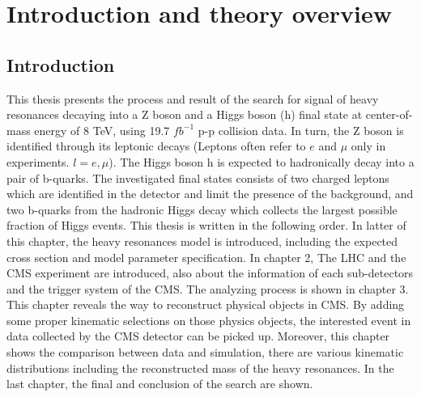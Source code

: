 \chapter{Introduction and theory overview}

\section{Introduction}
This thesis presents the process and result of the search for signal of heavy resonances decaying into a Z boson and a Higgs boson (h) final state at center-of-mass energy of 8 TeV, using 19.7 $fb^{-1}$ p-p collision data. In turn, the Z boson is identified through its leptonic decays (Leptons often refer to $e$ and $\mu$ only in experiments. $l = e, \mu$). The Higgs boson h is expected to hadronically decay into a pair of b-quarks. The investigated final states consists of two charged leptons which are identified in the detector and limit the presence of the background, and two b-quarks from the hadronic Higgs decay which collects the largest possible fraction of Higgs events.
\newline This thesis is written in the following order. In latter of this chapter, the heavy resonances model is introduced, including the expected cross section and model parameter specification. In chapter 2, The LHC and the CMS experiment are introduced, also about the information of each sub-detectors and the trigger system of the CMS. The analyzing process is shown in chapter 3. This chapter reveals the way to reconstruct physical objects in CMS. By adding some proper kinematic selections on those physics objects, the interested event in data collected by the CMS detector can be picked up. Moreover, this chapter shows the comparison between data and simulation, there are various kinematic distributions including the reconstructed mass of the heavy resonances. In the last chapter, the final and conclusion of the search are shown.

